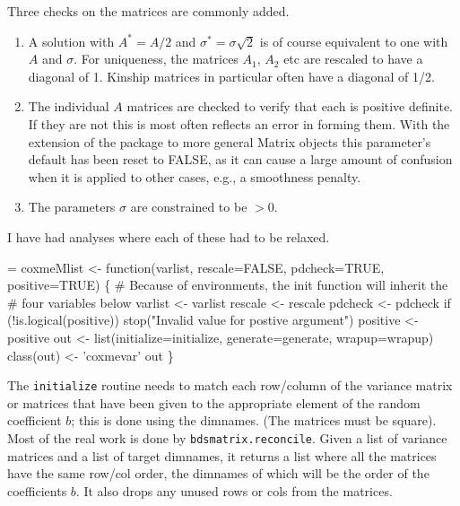 \documentclass{article}
\begin{document}
Three checks on the matrices are commonly added.  
\begin{enumerate}
\item A solution with $A^*= A/2$ and $\sigma^* = \sigma \sqrt{2}$ is
of course equivalent to one with $A$ and $\sigma$.
For uniqueness, the matrices $A_1$, $A_2$ etc are rescaled to have a
diagonal of 1.  Kinship matrices in particular often have a diagonal of 1/2.
\item The individual $A$ matrices are checked to verify that each is
positive definite.  If they are not this is most often reflects an 
error in forming them.
With the extension of the package to more general Matrix objects this
parameter's default has been reset to FALSE, as it can cause a large amount
of confusion when it is applied to other cases, e.g., a smoothness penalty.
\item The parameters $\sigma$ are constrained to be $>0$.
\end{enumerate}
I have had analyses where each of these had to be relaxed.

\begin{nwchunk}
=
 coxmeMlist <- function(varlist, rescale=FALSE, pdcheck=TRUE,  positive=TRUE) \{
     # Because of environments, the init function will inherit the
     #  four variables below 
     varlist <- varlist
     rescale <- rescale
     pdcheck <- pdcheck
     if (!is.logical(positive)) stop("Invalid value for postive argument")
     positive <- positive
     out <- list(initialize=initialize, generate=generate, wrapup=wrapup)
     class(out) <- 'coxmevar'
     out
     \}
\end{nwchunk}

The \Verb!initialize! routine needs to match each row/column of the variance
matrix or matrices that have been given to the appropriate element of
the random coefficient $b$; this is done using the dimnames.
(The matrices must be square).
Most of the real work is done by \Verb!bdsmatrix.reconcile!.  Given a list
of variance matrices and a list of target dimnames, it returns a list
where all the matrices have the same row/col order, the dimnames of
which will be the order of the coefficients $b$.  It also drops any
unused rows or cols from the matrices.
  
\end{document}
